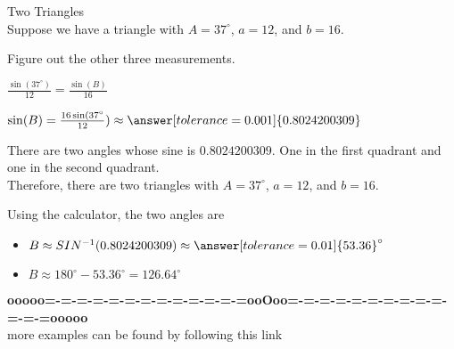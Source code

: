\documentclass{ximera}
\begin{document}
\begin{example}  Two Triangles \\

Suppose we have a triangle with $A=37^{\circ}$, $a=12$, and $b=16$.

Figure out the other three measurements.


\begin{explanation}


$\frac{\sin(37^{\circ})}{12} = \frac{\sin(B)}{16}$

$\sin(B) = \frac{16 \sin(37^{\circ}}{12}) \approx \answer[tolerance=0.001]{0.8024200309}$

There are two angles whose sine is $0.8024200309$. One in the first quadrant and one in the second quadrant. \\

Therefore, there are two triangles with $A=37^{\circ}$, $a=12$, and $b=16$. 

Using the calculator, the two angles are

\begin{itemize}
\item $B \approx SIN^{-1}(0.8024200309) \approx \answer[tolerance=0.01]{53.36}^{\circ}$
\item $B \approx 180^{\circ} - 53.36^{\circ} = 126.64^{\circ}$
\end{itemize}

\end{explanation}


\end{example}














\begin{center}
\textbf{\textcolor{green!50!black}{ooooo=-=-=-=-=-=-=-=-=-=-=-=-=ooOoo=-=-=-=-=-=-=-=-=-=-=-=-=ooooo}} \\

more examples can be found by following this link\\ 

\end{center}
\end{document}

